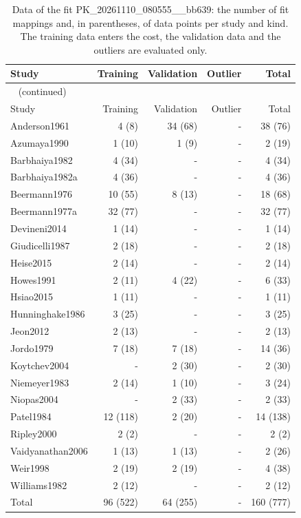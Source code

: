 \begin{longtable}{lrrrr}
\caption{Data of the fit PK\_20261110\_080555\_\_bb639: the number of fit mappings and, in parentheses, of data points per study and kind. The training data enters the cost, the validation data and the outliers are evaluated only.}\label{tab:data:PK_20261110_080555__bb639} \\
\toprule
Study & Training & Validation & Outlier & Total \\
\midrule
\endfirsthead
\multicolumn{5}{l}{\small\tablename~\thetable{} (continued)} \\
\toprule
Study & Training & Validation & Outlier & Total \\
\midrule
\endhead
\bottomrule
\endlastfoot
Anderson1961 & 4 (8) & 34 (68) & - & 38 (76) \\
Azumaya1990 & 1 (10) & 1 (9) & - & 2 (19) \\
Barbhaiya1982 & 4 (34) & - & - & 4 (34) \\
Barbhaiya1982a & 4 (36) & - & - & 4 (36) \\
Beermann1976 & 10 (55) & 8 (13) & - & 18 (68) \\
Beermann1977a & 32 (77) & - & - & 32 (77) \\
Devineni2014 & 1 (14) & - & - & 1 (14) \\
Giudicelli1987 & 2 (18) & - & - & 2 (18) \\
Heise2015 & 2 (14) & - & - & 2 (14) \\
Howes1991 & 2 (11) & 4 (22) & - & 6 (33) \\
Hsiao2015 & 1 (11) & - & - & 1 (11) \\
Hunninghake1986 & 3 (25) & - & - & 3 (25) \\
Jeon2012 & 2 (13) & - & - & 2 (13) \\
Jordo1979 & 7 (18) & 7 (18) & - & 14 (36) \\
Koytchev2004 & - & 2 (30) & - & 2 (30) \\
Niemeyer1983 & 2 (14) & 1 (10) & - & 3 (24) \\
Niopas2004 & - & 2 (33) & - & 2 (33) \\
Patel1984 & 12 (118) & 2 (20) & - & 14 (138) \\
Ripley2000 & 2 (2) & - & - & 2 (2) \\
Vaidyanathan2006 & 1 (13) & 1 (13) & - & 2 (26) \\
Weir1998 & 2 (19) & 2 (19) & - & 4 (38) \\
Williams1982 & 2 (12) & - & - & 2 (12) \\
Total & 96 (522) & 64 (255) & - & 160 (777) \\
\end{longtable}

